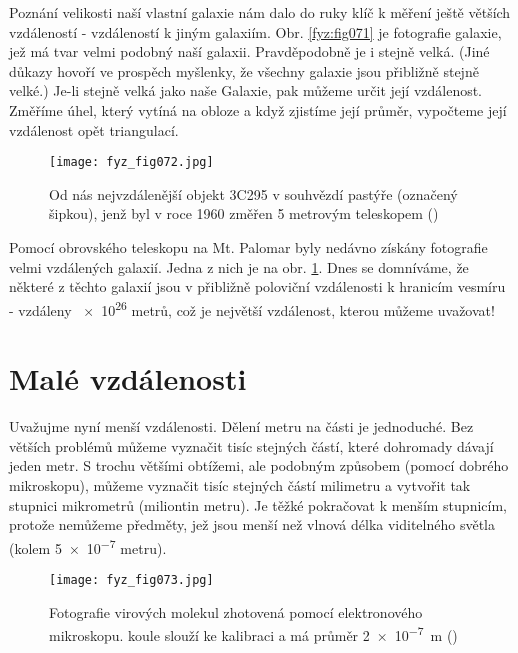     Poznání velikosti naší vlastní galaxie nám dalo do ruky klíč k měření ještě větších vzdáleností 
    - vzdáleností k jiným galaxiím. Obr. \ref{fyz:fig071} je fotografie galaxie, jež má tvar velmi 
    podobný naší galaxii. Pravděpodobně je i stejně velká. (Jiné důkazy hovoří ve prospěch 
    myšlenky, že všechny galaxie jsou přibližně stejně velké.) Je-li stejně velká jako naše 
    Galaxie, pak můžeme určit její vzdálenost. Změříme úhel, který vytíná na obloze a když zjistíme 
    její průměr, vypočteme její vzdálenost opět triangulací.

    \begin{figure}[ht!]  %
      \centering
      \texttt{[image: fyz\_fig072.jpg]}
      \caption{Od nás nejvzdálenější objekt 3C295 v souhvězdí pastýře (označený šipkou), jenž byl v 
               roce \num{1960} změřen \num{5} metrovým teleskopem (\cite[s.~73]{Feynman01})}
      \label{fyz:fig072}
    \end{figure}
    
    Pomocí obrovského teleskopu na Mt. Palomar byly nedávno získány fotografie velmi vzdálených 
    galaxií. Jedna z nich je na obr. \ref{fyz:fig072}. Dnes se domníváme, že některé z těchto 
    galaxií jsou v přibližně poloviční vzdálenosti k hranicím vesmíru - vzdáleny \num{e26} metrů, 
    což je největší vzdálenost, kterou můžeme uvažovat!
    
  \section{Malé vzdálenosti}
    Uvažujme nyní menší vzdálenosti. Dělení metru na části je jednoduché. Bez větších problémů 
    můžeme vyznačit tisíc stejných částí, které dohromady dávají jeden metr. S trochu většími 
    obtížemi, ale podobným způsobem (pomocí dobrého mikroskopu), můžeme vyznačit tisíc stejných 
    částí milimetru a vytvořit tak stupnici mikrometrů (miliontin metru). Je těžké pokračovat k 
    menším stupnicím, protože nemůžeme  předměty, jež jsou menší než vlnová délka 
    viditelného světla (kolem \num{5e-7} metru).

    \begin{figure}[ht!]  %
      \centering
      \texttt{[image: fyz\_fig073.jpg]}
      \caption{Fotografie virových molekul zhotovená pomocí elektronového mikroskopu.  
               koule slouží ke kalibraci a má průměr \SI{2e-7}{\m}  (\cite[s.~74]{Feynman01})}
      \label{fyz:fig073}
    \end{figure}
    
